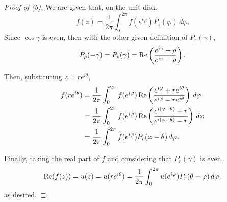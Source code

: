 \documentclass[../hw2]{subfiles}
\begin{document}
\begin{proof}[Proof of (b)]
	We are given that, on the unit disk, \[
		f(z)=\frac{1}{2\pi}\int_{0}^{2\pi} f(e^{i\varphi}) P_z(\varphi) \,d\varphi
		.\]
	Since $\cos{\gamma}$ is even, then with the other given definition of $P_r(\gamma)$,  \[
		P_{\rho}(-\gamma)=P_{\rho}(\gamma)= \operatorname{Re} \left( \frac{ e^{i\gamma} + \rho }{e^{i\gamma} - \rho} \right)
		.\]

	Then, substituting $z=re^{i\theta}$,
	\begin{align*}
		f(re^{i\theta}) & = \frac{1}{2\pi}\int_{0}^{2\pi} f(e^{i\varphi}) \operatorname{Re} \left( \frac{e^{i\varphi} + re^{i\theta}}{e^{i\varphi} - re^{i\theta}} \right) \,d\varphi \\
		                & = \frac{1}{2\pi}\int_{0}^{2\pi} f(e^{i\varphi}) \operatorname{Re} \left( \frac{e^{i(\varphi-\theta)} + r}{e^{i(\varphi-\theta)}-r} \right) \,d\varphi       \\
		                & =  \frac{1}{2\pi}\int_{0}^{2\pi} f(e^{i\varphi}) P_r(\varphi-\theta) \,d\varphi
		.\end{align*}

	Finally, taking the real part of $f$ and considering that $P_r(\gamma)$ is even, \[
		\operatorname{Re}(f(z))=u(z)=u(re^{i\theta})=\frac{1}{2\pi}\int_{0}^{2\pi} u(e^{i\varphi}) P_r(\theta-\varphi)\,d \varphi
		,\] as desired.
\end{proof}
\end{document}
